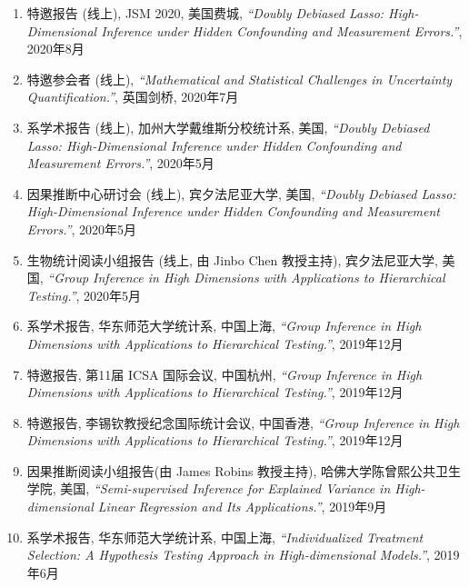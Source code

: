 \documentclass[margin, line]{res}
\begin{document}
\begin{resume}
\begin{enumerate}
            \item 特邀报告 (线上), JSM 2020, 美国费城, {\it ``Doubly Debiased Lasso: High-Dimensional Inference under Hidden Confounding and Measurement Errors.''}, 
                2020年8月

            \item 特邀参会者 (线上), {\it ``Mathematical and Statistical Challenges in Uncertainty Quantification.''}, 
                英国剑桥, 2020年7月

            \item 系学术报告 (线上), 加州大学戴维斯分校统计系, 美国, {\it ``Doubly Debiased Lasso: High-Dimensional Inference under Hidden Confounding and Measurement Errors.''}, 
                2020年5月

            \item 因果推断中心研讨会 (线上), 宾夕法尼亚大学, 美国, 
                {\it ``Doubly Debiased Lasso: High-Dimensional Inference under Hidden Confounding and Measurement Errors.''}, 
                2020年5月

            \item 生物统计阅读小组报告 (线上, 由 Jinbo Chen 教授主持), 宾夕法尼亚大学, 美国, {\it ``Group Inference in High Dimensions with Applications to Hierarchical Testing.''}, 
                2020年5月

            \item 系学术报告, 华东师范大学统计系, 中国上海, 
                {\it ``Group Inference in High Dimensions with Applications to Hierarchical Testing.''}, 
                2019年12月

            \item 特邀报告, 第11届 ICSA 国际会议, 中国杭州, {\it ``Group Inference in High Dimensions with Applications to Hierarchical Testing.''}, 
                2019年12月

            \item 特邀报告, 李锡钦教授纪念国际统计会议, 中国香港, {\it ``Group Inference in High Dimensions with Applications to Hierarchical Testing.''}, 
                2019年12月

            \item 因果推断阅读小组报告(由 James Robins 教授主持), 哈佛大学陈曾熙公共卫生学院, 美国, {\it ``Semi-supervised Inference for Explained Variance in High-dimensional Linear Regression and Its Applications.''}, 
                2019年9月

            \item 系学术报告, 华东师范大学统计系, 中国上海, 
                {\it ``Individualized Treatment Selection: A Hypothesis Testing Approach in High-dimensional Models.''}, 
                2019年6月


\end{enumerate}
\end{resume}
\end{document}
